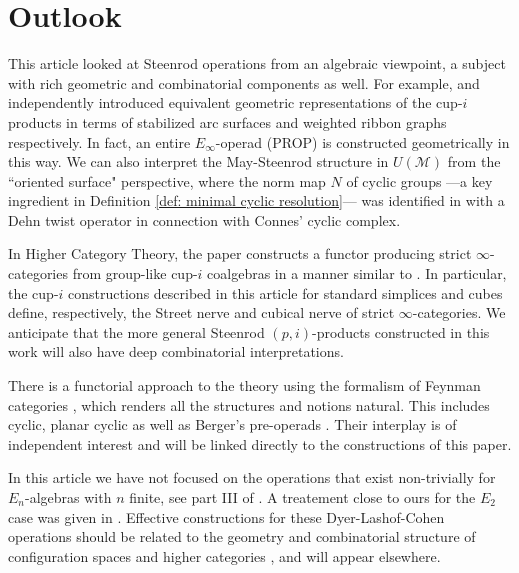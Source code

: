 
\section{Outlook} \label{s:outlook}

This article looked at Steenrod operations from an algebraic viewpoint, a subject with rich geometric and combinatorial components as well. For example, \cite{Postnikov} and \cite{medina2018prop2} independently introduced equivalent geometric representations of the cup-$i$ products in terms of stabilized arc surfaces \cite{KLP} and weighted ribbon graphs respectively. In fact, an entire $E_\infty$-operad (PROP) is constructed geometrically in this way. We can also interpret the May-Steenrod structure in $U(\mathcal M)$ from the ``oriented surface" perspective, where the norm map $N$ of cyclic groups ---a key ingredient in Definition \ref{def: minimal cyclic resolution}--- was identified in \cite{KLP} with a Dehn twist operator in connection with Connes' cyclic complex.

In Higher Category Theory, the paper \cite{medina2020globular} constructs a functor producing strict \mbox{$\infty$-cat}egories from group-like cup-$i$ coalgebras in a manner similar to \cite{steiner2004omega}. In particular, the cup-$i$ constructions described in this article for standard simplices and cubes define, respectively, the Street nerve and cubical nerve of strict $\infty$-categories. We anticipate that the more general Steenrod $(p,i)$-products constructed in this work will also have deep combinatorial interpretations.

There is a functorial approach to the theory using the formalism of Feynman categories \cite{feynman},
which renders all the structures and notions natural. This includes cyclic, planar cyclic as well as Berger's pre-operads \cite{BergerRecog}. Their interplay is of independent interest \cite{BergerKaufmann,feyrep} and will be linked directly to the constructions of this paper.

In this article we have not focused on the operations that exist non-trivially for \mbox{$E_n$-algebras} with $n$ finite, see part III of \cite{may76homology}. A treatement close to ours for the $E_2$ case was given in \cite{Tourtchine}. Effective constructions for these Dyer-Lashof-Cohen operations should be related to the geometry and combinatorial structure of configuration spaces \cite{KZhang,sinha2013littledisks,berger04combinatorial,ayala2014configuration} and higher categories \cite{Bathigher, BalFiedSchwVogt, Rezkhigher}, and will appear elsewhere.

